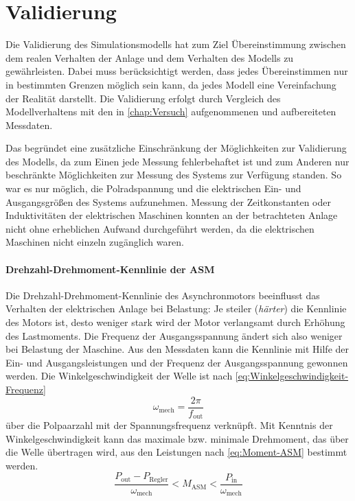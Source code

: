 \section{Validierung}
\label{sec:Validierung}
Die Validierung des Simulationsmodells hat zum Ziel Übereinstimmung zwischen dem realen Verhalten der Anlage und dem Verhalten des Modells zu gewährleisten. Dabei muss berücksichtigt werden, dass jedes Übereinstimmen nur in bestimmten Grenzen möglich sein kann, da jedes Modell eine Vereinfachung der Realität darstellt. Die Validierung erfolgt durch Vergleich des Modellverhaltens mit den in \cref{chap:Versuch} aufgenommenen und aufbereiteten Messdaten. 

Das begründet eine zusätzliche Einschränkung der Möglichkeiten zur Validierung des Modells, da zum Einen jede Messung fehlerbehaftet ist und zum Anderen nur beschränkte Möglichkeiten zur Messung des Systems zur Verfügung standen. So war es nur möglich, die Polradspannung und die elektrischen Ein- und Ausgangsgrößen des Systems aufzunehmen. Messung der Zeitkonstanten oder Induktivitäten der elektrischen Maschinen konnten an der betrachteten Anlage nicht ohne erheblichen Aufwand durchgeführt werden, da die elektrischen Maschinen nicht einzeln zugänglich waren.

\paragraph{Drehzahl-Drehmoment-Kennlinie der ASM}
Die Drehzahl-Drehmoment-Kennlinie des Asynchronmotors beeinflusst das Verhalten der elektrischen Anlage bei Belastung: Je steiler (\emph{härter}) die Kennlinie des Motors ist, desto weniger stark wird der Motor verlangsamt durch Erhöhung des Lastmoments. Die Frequenz der Ausgangsspannung ändert sich also weniger bei Belastung der Maschine. Aus den Messdaten kann die Kennlinie mit Hilfe der Ein- und Ausgangsleistungen und der Frequenz der Ausgangsspannung gewonnen werden. Die Winkelgeschwindigkeit der Welle ist nach \cref{eq:Winkelgeschwindigkeit-Frequenz} 
\begin{equation}
    \omega_{\mathrm{mech}} = \frac{2\pi}{f_{\mathrm{out}}} \label{eq:Winkelgeschwindigkeit-Frequenz}
\end{equation}
über die Polpaarzahl mit der Spannungsfrequenz verknüpft. Mit Kenntnis der Winkelgeschwindigkeit kann das maximale bzw. minimale Drehmoment, das über die Welle übertragen wird, aus den Leistungen nach \cref{eq:Moment-ASM} bestimmt werden.
\begin{equation}
    \frac{P_{\mathrm{out}} - P_{\mathrm{Regler}}}{\omega_{\mathrm{mech}}} < M_{\mathrm{ASM}} < \frac{P_{\mathrm{in}}}{\omega_{\mathrm{mech}}} \label{eq:Moment-ASM}
\end{equation}

